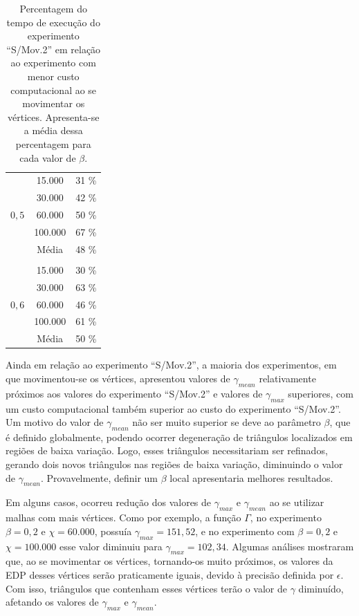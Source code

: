 \begin{table}[!ht]
\begin{center}
\begin{tabular}{ccc}
\multirow{5}{*}{$0,5$} 
& 15.000  &  31 \% \\
& 30.000  &  42 \% \\
& 60.000  &  50 \% \\
& 100.000 &  67 \% \\
\hline              
& Média & 48 \% \\
& & \\   
\multirow{5}{*}{$0,6$} 
& 15.000  &  30 \% \\
& 30.000  &  63 \% \\
& 60.000  &  46 \% \\
& 100.000 &  61 \% \\
\hline              
& Média & 50 \% \\
\end{tabular}%
\end{center}
\caption{Percentagem do tempo de execução do experimento ``S/Mov.2'' em relação ao experimento com menor custo computacional ao se movimentar os vértices. Apresenta-se a média dessa percentagem para cada valor de $\beta$.}
\label{tabela_analise_clock}
\end{table}

Ainda em relação ao experimento ``S/Mov.2'', a maioria dos experimentos, em que movimentou-se os vértices, apresentou valores de $\gamma_{mean}$ relativamente próximos aos valores do experimento ``S/Mov.2'' e valores de $\gamma_{max}$ superiores, com um custo computacional também superior ao custo do experimento ``S/Mov.2''. Um motivo do valor de $\gamma_{mean}$ não ser muito superior se deve ao parâmetro $\beta$, que é definido globalmente, podendo ocorrer degeneração de triângulos localizados em regiões de baixa variação. Logo, esses triângulos necessitariam ser refinados, gerando dois novos triângulos nas regiões de baixa variação, diminuindo o valor de $\gamma_{mean}$. Provavelmente, definir um $\beta$ local apresentaria melhores resultados.

Em alguns casos, ocorreu redução dos valores de $\gamma_{max}$ e $\gamma_{mean}$ ao se utilizar malhas com mais vértices. Como por exemplo, a função $\Gamma$, no experimento $\beta = 0,2$ e $\chi = 60.000$, possuía $\gamma_{max} = 151,52$, e no experimento com $\beta = 0,2$ e $\chi = 100.000$ esse valor diminuiu para $\gamma_{max} = 102,34$. Algumas análises mostraram que, ao se movimentar os vértices, tornando-os muito próximos, os valores da EDP desses vértices serão praticamente iguais, devido à precisão definida por $\epsilon$. Com isso, triângulos que contenham esses vértices terão o valor de $\gamma$ diminuído, afetando os valores de $\gamma_{max}$ e $\gamma_{mean}$. 

